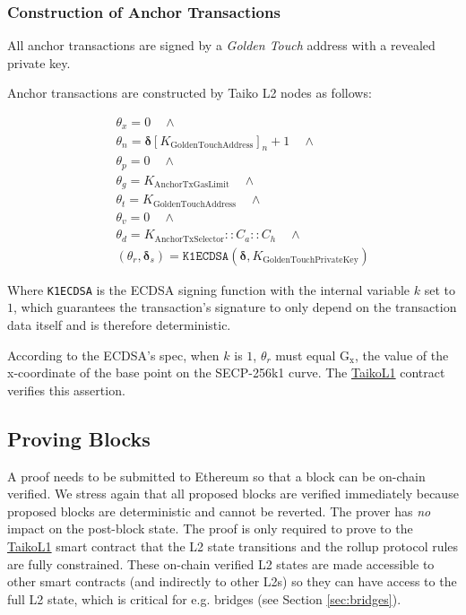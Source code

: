 \documentclass[9pt,oneside]{amsart}
\begin{document}
\begin{multicols}{2}
\subsubsection{Construction of Anchor Transactions} All anchor transactions are signed by a \textit{Golden Touch} address with a revealed private key. 

Anchor transactions are constructed by Taiko L2 nodes as follows:

\begin{eqnarray}
& & \theta_x = 0 \quad \wedge \\
\nonumber& & \theta_n = \boldsymbol{\delta}[K_{\mathrm{GoldenTouchAddress}}]_n + 1 \quad \wedge \\
\nonumber& & \theta_p = 0 \quad \wedge \\
\nonumber& & \theta_g = K_{\mathrm{AnchorTxGasLimit}} \quad \wedge \\
\nonumber& & \theta_t = K_{\mathrm{GoldenTouchAddress}} \quad \wedge  \\
\nonumber& & \theta_v = 0 \quad \wedge  \\
\nonumber& & \theta_d = K_{\mathrm{AnchorTxSelector}}::C_a::C_h \quad \wedge  \\
\nonumber& & (\theta_r,\boldsymbol{\delta}_s) = \texttt{K1ECDSA}(\boldsymbol{\delta}, K_{\mathrm{GoldenTouchPrivateKey}})
\end{eqnarray}

Where \texttt{K1ECDSA} is the ECDSA\cite{ecdsa} signing function with the internal variable $k$ set to $1$, which guarantees the transaction's signature to only depend on the transaction data itself and is therefore deterministic.

According to the ECDSA's spec, when $k$ is $1$, $\theta_r$ must equal $\mathrm{G_x}$, the value of the x-coordinate of the base point on the SECP-256k1 curve. The \underline{TaikoL1} contract verifies this assertion.

\subsection{Proving Blocks} \label{sec:proving}

A proof needs to be submitted to Ethereum so that a block can be on-chain verified. We stress again that all proposed blocks are verified immediately because proposed blocks are deterministic and cannot be reverted. The prover has \emph{no} impact on the post-block state. The proof is only required to prove to the \underline{TaikoL1} smart contract that the L2 state transitions and the rollup protocol rules are fully constrained. These on-chain verified L2 states are made accessible to other smart contracts (and indirectly to other L2s) so they can have access to the full L2 state, which is critical for e.g. bridges (see Section \ref{sec:bridges}).


\end{multicols}
\end{document}
